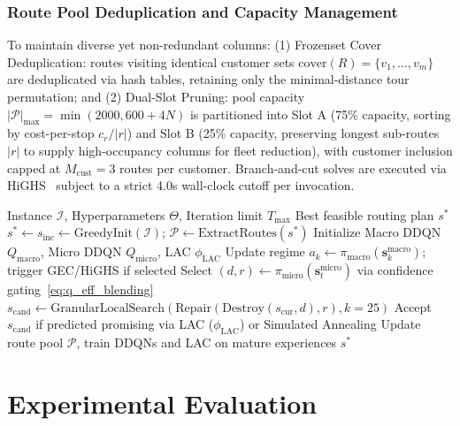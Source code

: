 \documentclass{ieeeaccess}
\begin{document}
\subsubsection{Route Pool Deduplication and Capacity Management}
To maintain diverse yet non-redundant columns: (1) Frozenset Cover Deduplication: routes visiting identical customer sets $\text{cover}(R) = \{v_1, \dots, v_m\}$ are deduplicated via hash tables, retaining only the minimal-distance tour permutation; and (2) Dual-Slot Pruning: pool capacity $|\mathcal{P}|_{\max} = \min(2000, 600 + 4N)$ is partitioned into Slot A (75\% capacity, sorting by cost-per-stop $c_r / |r|$) and Slot B (25\% capacity, preserving longest sub-routes $|r|$ to supply high-occupancy columns for fleet reduction), with customer inclusion capped at $M_{\text{cust}} = 3$ routes per customer.
Branch-and-cut solves are executed via HiGHS~\cite{huangfu2018parallelizing} subject to a strict 4.0s wall-clock cutoff per invocation.

\begin{algorithm}[!t]
\caption{Tri-Level Hybrid DDQN-ALNS Overview}
\label{alg:hybrid_ddqn_alns}
\footnotesize
\begin{algorithmic}[1]
\Require Instance $\mathcal{I}$, Hyperparameters $\Theta$, Iteration limit $T_{\max}$
\Ensure Best feasible routing plan $s^*$
\State $s^* \leftarrow s_{\text{inc}} \leftarrow \text{GreedyInit}(\mathcal{I})$; $\mathcal{P} \leftarrow \text{ExtractRoutes}(s^*)$
\State Initialize Macro DDQN $Q_{\text{macro}}$, Micro DDQN $Q_{\text{micro}}$, LAC $\phi_{\text{LAC}}$
     
        \State Update regime $a_k \leftarrow \pi_{\text{macro}}(\mathbf{s}_k^{\text{macro}})$; trigger GEC/HiGHS if selected
    \EndIf
    \State Select $(d, r) \leftarrow \pi_{\text{micro}}(\mathbf{s}_t^{\text{micro}})$ via confidence gating~\eqref{eq:q_eff_blending}
    \State $s_{\text{cand}} \leftarrow \text{GranularLocalSearch}(\text{Repair}(\text{Destroy}(s_{\text{cur}}, d), r), k=25)$
    \State Accept $s_{\text{cand}}$ if predicted promising via LAC ($\phi_{\text{LAC}}$) or Simulated Annealing
    \State Update route pool $\mathcal{P}$, train DDQNs and LAC on mature experiences
\EndFor
\State \Return $s^*$ 
\end{algorithmic}
\end{algorithm}

\section{Experimental Evaluation}
\label{sec:experiments}
\end{document}
